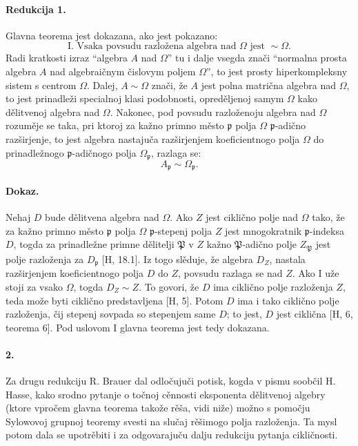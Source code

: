 \documentclass[11pt]{article}
\begin{document}
\paragraph{Redukcija 1.}
Glavna teorema jest dokazana, ako jest pokazano:
\[
\text{I. Vsaka povsudu razložena algebra nad }\Omega\text{ jest } \sim \Omega .
\]
Radi kratkosti izraz ``algebra \(A\) nad \(\Omega\)'' tu i dalje vsegda znači ``normalna prosta algebra \(A\) nad algebraičnym čislovym poljem \(\Omega\)'', to jest prosty hiperkompleksny sistem s centrom \(\Omega\). Dalej, \(A\sim\Omega\) znači, že \(A\) jest polna matrična algebra nad \(\Omega\), to jest prinadleži specialnoj klasi podobnosti, opreděljenoj samym \(\Omega\) kako dělitvenoj algebra nad \(\Omega\). Nakonec, pod povsudu razloženoju algebra nad \(\Omega\) rozuměje se taka, pri ktoroj za kažno primno město \(\mathfrak p\) polja \(\Omega\) \( \mathfrak p\)-adično razširjenje, to jest algebra nastajuča razširjenjem koeficientnogo polja \(\Omega\) do prinadležnogo \( \mathfrak p\)-adičnogo polja \(\Omega_{\mathfrak p}\), razlaga se:
\[
A_{\mathfrak p}\sim \Omega_{\mathfrak p}.
\]

\paragraph{Dokaz.}
Nehaj \(D\) bude dělitvena algebra nad \(\Omega\). Ako \(Z\) jest ciklično polje nad \(\Omega\) tako, že za kažno primno město \(\mathfrak p\) polja \(\Omega\) \( \mathfrak p\)-stepenj polja \(Z\) jest mnogokratnik \( \mathfrak p\)-indeksa \(D\), togda za prinadležne primne dělitelji \(\mathfrak P\) v \(Z\) kažno \( \mathfrak P\)-adično polje \(Z_{\mathfrak P}\) jest polje razloženja za \(D_{\mathfrak p}\) [H, 18.1]. Iz togo slěduje, že algebra \(D_Z\), nastala razširjenjem koeficientnogo polja \(D\) do \(Z\), povsudu razlaga se nad \(Z\). Ako I uže stoji za vsako \(\Omega\), togda \(D_Z\sim Z\). To govori, že \(D\) ima ciklično polje razloženja \(Z\), teda može byti ciklično predstavljena [H, 5]. Potom \(D\) ima i tako ciklično polje razloženja, čij stepenj sovpada so stepenjem same \(D\); to jest, \(D\) jest ciklična [H, 6, teorema 6]. Pod uslovom I glavna teorema jest tedy dokazana.

\paragraph{2.}
Za drugu redukciju R. Brauer dal odločujuči potisk, kogda v pismu soobčil H. Hasse, kako srodno pytanje o točnoj cěnnosti eksponenta dělitvenoj algebry (ktore vpročem glavna teorema takože rěša, vidi niže) možno s pomočju Sylowovoj grupnoj teoremy svesti na slučaj rěšimogo polja razloženja. Ta mysl potom dala se upotrěbiti i za odgovarajuču dalju redukciju pytanja cikličnosti.
\end{document}
